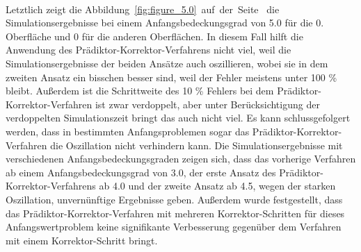 \documentclass{listhesis}
\begin{document}
\paragraph{}
Letztlich zeigt die Abbildung~\ref{fig:figure_5.0}~auf~der~Seite~\pageref{fig:figure_5.0} die Simulationsergebnisse bei einem Anfangsbedeckungsgrad von 5.0 für die 0. Oberfläche und 0 für die anderen Oberflächen. In diesem Fall hilft die Anwendung des Prädiktor-Korrektor-Verfahrens nicht viel, weil die Simulationsergebnisse der beiden Ansätze auch oszillieren, wobei sie in dem zweiten Ansatz ein bisschen besser sind, weil der Fehler meistens unter 100 \% bleibt. Außerdem ist die Schrittweite des 10 \% Fehlers bei dem Prädiktor-Korrektor-Verfahren ist zwar verdoppelt, aber unter Berücksichtigung der verdoppelten Simulationszeit bringt das auch nicht viel. Es kann schlussgefolgert werden, dass in bestimmten Anfangsproblemen sogar das Prädiktor-Korrektor-Verfahren die Oszillation nicht verhindern kann. Die Simulationsergebnisse mit verschiedenen Anfangsbedeckungsgraden zeigen sich, dass das vorherige Verfahren ab einem Anfangsbedeckungsgrad von 3.0, der erste Ansatz des Prädiktor-Korrektor-Verfahrens ab 4.0 und der zweite Ansatz ab 4.5, wegen der starken Oszillation, unvernünftige Ergebnisse geben. Außerdem wurde festgestellt, dass das Prädiktor-Korrektor-Verfahren mit mehreren Korrektor-Schritten für dieses Anfangswertproblem keine signifikante Verbesserung gegenüber dem Verfahren mit einem Korrektor-Schritt bringt.



\clearpage
\end{document}
